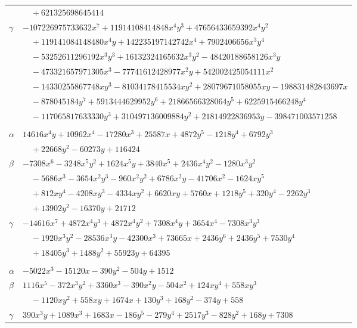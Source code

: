 \documentclass[11pt]{article}
\begin{document}
\begin{longtable}{@{}ll@{}}
 & $\quad +621325698645414$\\
$\gamma$ & $-107226975733632x^{7}+11914108414848x^{4}y^{3}+47656433659392x^{4}y^{2}$\\
 & $\quad +119141084148480x^{4}y+142235197142742x^{4}+7902406656x^{3}y^{4}$\\
 & $\quad -53252611296192x^{3}y^{3}+16132324165632x^{3}y^{2}-48420188658126x^{3}y$\\
 & $\quad -473321657971305x^{3}-77741612428977x^{2}y+542002425054111x^{2}$\\
 & $\quad -14330255867748xy^{3}-81034178415534xy^{2}+28079671058055xy-198831482843697x$\\
 & $\quad -878045184y^{7}+5913444629952y^{6}+21866566328064y^{5}+6225915466248y^{4}$\\
 & $\quad -117065817633330y^{3}+310497136009884y^{2}+21814922836953y-398471003571258$\\
\addlinespace[3pt]
\multicolumn{2}{@{}l}{$\{i,j\}=\{18,151\}$, $k_{ij}=2^{3}\cdot 3^{4}\cdot 7^{2}\cdot 11$}\\
$\alpha$ & $14616x^{4}y+10962x^{4}-17280x^{3}+25587x+4872y^{5}-1218y^{4}+6792y^{3}$\\
 & $\quad +22668y^{2}-60273y+116424$\\
$\beta$ & $-7308x^{6}-3248x^{5}y^{2}+1624x^{5}y+3840x^{5}+2436x^{4}y^{2}-1280x^{3}y^{2}$\\
 & $\quad -5686x^{3}-3654x^{2}y^{3}-960x^{2}y^{2}+6786x^{2}y-41706x^{2}-1624xy^{5}$\\
 & $\quad +812xy^{4}-4208xy^{3}-4334xy^{2}+6620xy+5760x+1218y^{5}+320y^{4}-2262y^{3}$\\
 & $\quad +13902y^{2}-16370y+21712$\\
$\gamma$ & $-14616x^{7}+4872x^{4}y^{3}+4872x^{4}y^{2}+7308x^{4}y+3654x^{4}-7308x^{3}y^{3}$\\
 & $\quad -1920x^{3}y^{2}-28536x^{3}y-42300x^{3}+73665x+2436y^{6}+2436y^{5}+7530y^{4}$\\
 & $\quad +18405y^{3}+1488y^{2}+55923y+64395$\\
\addlinespace[3pt]
\multicolumn{2}{@{}l}{$\{i,j\}=\{18,175\}$, $k_{ij}=2^{3}\cdot 3^{4}\cdot 7$}\\
$\alpha$ & $-5022x^{3}-15120x-390y^{2}-504y+1512$\\
$\beta$ & $1116x^{5}-372x^{3}y^{2}+3360x^{3}-390x^{2}y-504x^{2}+124xy^{4}+558xy^{3}$\\
 & $\quad -1120xy^{2}+558xy+1674x+130y^{3}+168y^{2}-374y+558$\\
$\gamma$ & $390x^{3}y+1089x^{3}+1683x-186y^{5}-279y^{4}+2517y^{3}-828y^{2}+168y+7308$\\

\end{longtable}
\end{document}
